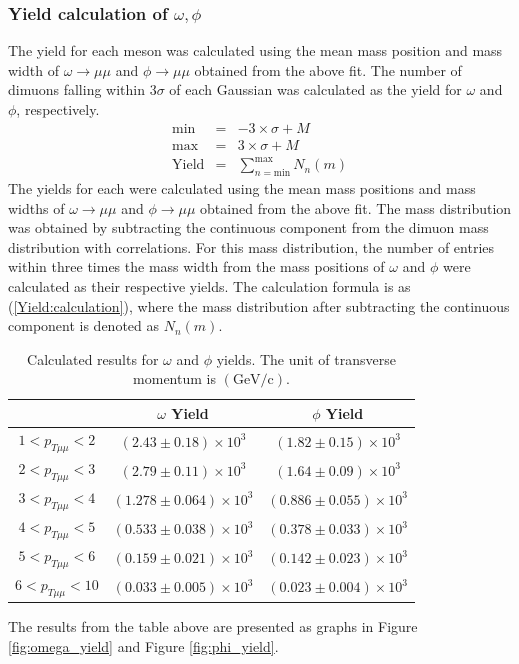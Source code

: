         \subsubsection{Yield calculation of $\omega,\phi$} 
        \label{Analysis:Dimuon:Yieldcal}
            The yield for each meson was calculated using the mean mass position and mass width of $\omega \rightarrow \mu\mu$ and $\phi \rightarrow \mu\mu$ obtained from the above fit. The number of dimuons falling within 3$\sigma$ of each Gaussian was calculated as the yield for $\omega$ and $\phi$, respectively.
            \begin{eqnarray}
                \mathrm{min} &=&  -3 \times \sigma + M \\
                \mathrm{max} &=&  3 \times \sigma + M \\
                \mathrm{Yield} &=& \sum_{n=\mathrm{min}}^{\mathrm{max}} N_n(m)
                \label{Yield:calculation}
            \end{eqnarray}
            The yields for each were calculated using the mean mass positions and mass widths of \(\omega \rightarrow \mu\mu\) and \(\phi \rightarrow \mu\mu\) obtained from the above fit. The mass distribution was obtained by subtracting the continuous component from the dimuon mass distribution with correlations. For this mass distribution, the number of entries within three times the mass width from the mass positions of \(\omega\) and \(\phi\) were calculated as their respective yields. The calculation formula is as (\ref{Yield:calculation}), where the mass distribution after subtracting the continuous component is denoted as \(N_n(m)\).
            \begin{table}[htbp]
                \centering
                \caption{Calculated results for $\omega$ and $\phi$ yields. The unit of transverse momentum is $(\mathrm{GeV/c})$.}
                \begin{tabular}{|c||c|c|}
                    \hline
                    & $\omega$ Yield & $\phi$ Yield \\ \hline \hline
                    $1 < p_{T\mu\mu} < 2$ &$(2.43\pm0.18)\times10^3$& $(1.82\pm0.15)\times10^3$\\ \hline
                    $2 < p_{T\mu\mu} < 3$ &$(2.79\pm0.11)\times10^3$& $(1.64\pm0.09)\times10^3$\\ \hline
                    $3 < p_{T\mu\mu} < 4$ &$(1.278\pm0.064)\times10^3$& $(0.886\pm0.055)\times10^3$\\ \hline
                    $4 < p_{T\mu\mu} < 5$ &$(0.533\pm0.038)\times10^3$& $(0.378\pm0.033)\times10^3$\\ \hline
                    $5 < p_{T\mu\mu} < 6$ &$(0.159\pm0.021)\times10^3$& $(0.142\pm0.023)\times10^3$\\ \hline
                    $6 < p_{T\mu\mu} < 10$ &$(0.033\pm0.005)\times10^3$& $(0.023\pm0.004)\times10^3$\\ \hline     
                \end{tabular}
                \label{Analysis:Dimuon:Yield:Results}
            \end{table}
            The results from the table above are presented as graphs in Figure \ref{fig:omega_yield} and Figure \ref{fig:phi_yield}.

